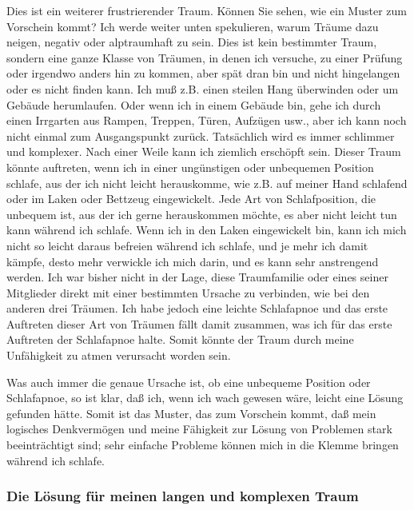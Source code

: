 Dies ist ein weiterer frustrierender Traum.
Können Sie sehen, wie ein Muster zum Vorschein kommt?
Ich werde weiter unten spekulieren, warum Träume dazu neigen, negativ oder alptraumhaft zu sein.
Dies ist kein bestimmter Traum, sondern eine ganze Klasse von Träumen, in denen ich versuche, zu einer Prüfung oder irgendwo anders hin zu kommen, aber spät dran bin und nicht hingelangen oder es nicht finden kann.
Ich muß z.B. einen steilen Hang überwinden oder um Gebäude herumlaufen.
Oder wenn ich in einem Gebäude bin, gehe ich durch einen Irrgarten aus Rampen, Treppen, Türen, Aufzügen usw., aber ich kann noch nicht einmal zum Ausgangspunkt zurück.
Tatsächlich wird es immer schlimmer und komplexer.
Nach einer Weile kann ich ziemlich erschöpft sein.
Dieser Traum könnte auftreten, wenn ich in einer ungünstigen oder unbequemen Position schlafe, aus der ich nicht leicht herauskomme, wie z.B. auf meiner Hand schlafend oder im Laken oder Bettzeug eingewickelt.
Jede Art von Schlafposition, die unbequem ist, aus der ich gerne herauskommen möchte, es aber nicht leicht tun kann während ich schlafe.
Wenn ich in den Laken eingewickelt bin, kann ich mich nicht so leicht daraus befreien während ich schlafe, und je mehr ich damit kämpfe, desto mehr verwickle ich mich darin, und es kann sehr anstrengend werden.
Ich war bisher nicht in der Lage, diese Traumfamilie oder eines seiner Mitglieder direkt mit einer bestimmten Ursache zu verbinden, wie bei den anderen drei Träumen.
Ich habe jedoch eine leichte Schlafapnoe und das erste Auftreten dieser Art von Träumen fällt damit zusammen, was ich für das erste Auftreten der Schlafapnoe halte.
Somit könnte der Traum durch meine Unfähigkeit zu atmen verursacht worden sein.

Was auch immer die genaue Ursache ist, ob eine unbequeme Position oder Schlafapnoe, so ist klar, daß ich, wenn ich wach gewesen wäre, leicht eine Lösung gefunden hätte.
Somit ist das Muster, das zum Vorschein kommt, daß mein logisches Denkvermögen und meine Fähigkeit zur Lösung von Problemen stark beeinträchtigt sind; sehr einfache Probleme können mich in die Klemme bringen während ich schlafe.
 

\subsubsection{Die Lösung für meinen langen und komplexen Traum}
\label{c3_5e}


